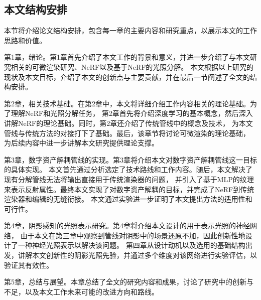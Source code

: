 \subsection{本文结构安排}
本节将介绍论文结构安排，包含每一章的主要内容和研究重点，以展示本文的工作思路和价值。

第1章，绪论。第1章首先介绍了本文工作的背景和意义，并进一步介绍了与本文研究相关的可微渲染研究、NeRF以及基于NeRF的光照分解。
本文根据以上研究的现状及本文目标，介绍了本文的创新点与主要贡献，并在最后一节阐述了全文的结构安排。

第2章，相关技术基础。在第2章中，本文将详细介绍工作内容相关的理论基础。为了理解NeRF和光照分解任务，
第2章首先将介绍深度学习的基本概念，然后深入讲解NeRF的理论基础。同时，第2章还介绍了传统管线中的概念及技术，
为本文管线与传统方法的对接打下了基础。最后，该章节将讨论可微渲染的理论基础，
为后续内容中进一步讲解本文研究提供理论支撑。

第3章，数字资产解耦管线的实现。第3章将介绍本文对数字资产解耦管线这一目标的具体实现。
本文首先通过分析选定了技术路线和工作内容。随后，本文解决了现有分解管线无法将输出直接用于传统渲染器的问题，
并引入了基于MLP的纹理来表示反射属性。最终本文实现了对数字资产解耦的目标，并完成了NeRF到传统渲染器和编辑的无缝衔接。
本文通过实验进一步证明了本文提出方法的适用性和可行性。

第4章，阴影感知的光照表示研究。第4章将介绍本文设计的用于表示光照的神经网络，
由于本文在第三章中观察到管线对阴影中的场景还原不加，因此创新性地设计了一种神经光照表示以解决该问题。
第四章从设计动机以及选用的基础结构出发，讲解本文创新性的阴影光照先验，并通过多个维度对该网络进行实验评估，以验证其有效性。

第5章，总结与展望。本章总结了全文的研究内容和成果，讨论了研究中的创新与不足，以及本文工作未来可能的改进方向和路线。

